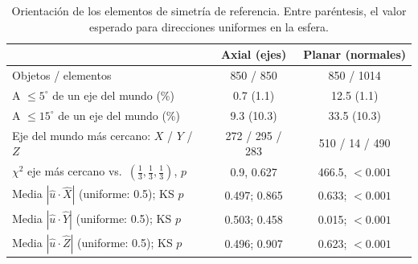 \begin{table}[htbp]
\centering
\small
\caption{Orientación de los elementos de simetría de referencia. Entre paréntesis, el valor esperado para direcciones uniformes en la esfera.}
\label{tab:orientacion_gt}
\begin{tabular}{lcc}
\toprule
 & Axial (ejes) & Planar (normales) \\
\midrule
Objetos / elementos & 850 / 850 & 850 / 1014 \\
A $\leq 5^\circ$ de un eje del mundo (\%) & 0.7 (1.1) & 12.5 (1.1) \\
A $\leq 15^\circ$ de un eje del mundo (\%) & 9.3 (10.3) & 33.5 (10.3) \\
Eje del mundo más cercano: $X$ / $Y$ / $Z$ & 272 / 295 / 283 & 510 / 14 / 490 \\
$\chi^2$ eje más cercano vs.\ $(\tfrac13,\tfrac13,\tfrac13)$, $p$ & 0.9, 0.627 & 466.5, $<0.001$ \\
Media $|\hat{u}\cdot\hat{X}|$ (uniforme: 0.5); KS $p$ & 0.497; 0.865 & 0.633; $<0.001$ \\
Media $|\hat{u}\cdot\hat{Y}|$ (uniforme: 0.5); KS $p$ & 0.503; 0.458 & 0.015; $<0.001$ \\
Media $|\hat{u}\cdot\hat{Z}|$ (uniforme: 0.5); KS $p$ & 0.496; 0.907 & 0.623; $<0.001$ \\
\bottomrule
\end{tabular}
\end{table}
